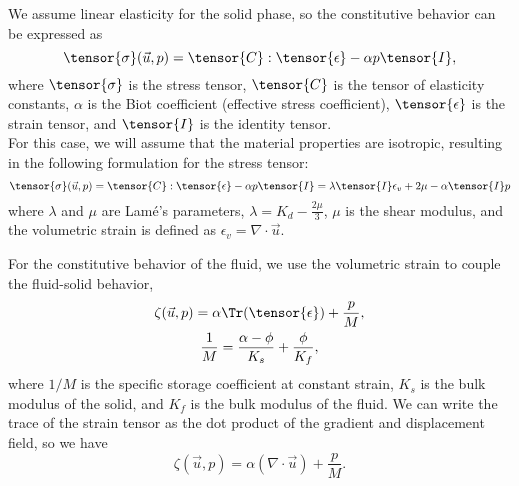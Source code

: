 We assume linear elasticity for the solid phase, so the constitutive behavior can be expressed
as
\begin{equation}
  \tensor{\sigma}(\vec{u},p) = \tensor{C} : \tensor{\epsilon} - \alpha p \tensor{I},
\end{equation}
where $\tensor{\sigma}$ is the stress tensor, $\tensor{C}$ is the
tensor of elasticity constants, $\alpha$ is the Biot coefficient
(effective stress coefficient), $\tensor{\epsilon}$ is the strain
tensor, and $\tensor{I}$ is the identity tensor.\\
For this case, we will assume that the material properties are isotropic, resulting
in the following formulation for the stress tensor:
\begin{equation}
    \tensor{\sigma}(\vec{u},p) = \tensor{C}:\tensor{\epsilon} - \alpha p \tensor{I}
                                           = \lambda \tensor{I} \epsilon_{v} + 2 \mu - \alpha \tensor{I} p
\end{equation}
where $\lambda$ and $\mu$ are Lam\'e's parameters,
$\lambda = K_{d} - \frac{2 \mu}{3}$, $\mu$ is the shear modulus, and
the volumetric strain is defined as
$\epsilon_{v} = \nabla \cdot \vec{u}$.

For the constitutive behavior of the fluid, we use the volumetric
strain to couple the fluid-solid behavior,
\begin{gather}
  \zeta(\vec{u},p) = \alpha \Tr({\tensor{\epsilon}}) + \frac{p}{M}, \\
%
  \frac{1}{M} = \frac{\alpha-\phi}{K_s} + \frac{\phi}{K_f},
\end{gather}
where $1/M$ is the specific storage coefficient at constant strain,
$K_s$ is the bulk modulus of the solid, and $K_f$ is the bulk modulus
of the fluid. We can write the trace of the strain tensor as the dot
product of the gradient and displacement field, so we have
\begin{equation}
  \zeta(\vec{u},p) = \alpha (\nabla \cdot \vec{u}) + \frac{p}{M}.
\end{equation}

